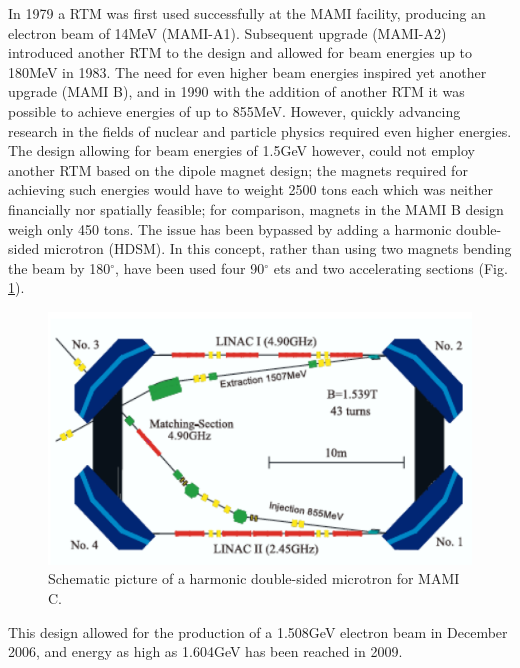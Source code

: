 In 1979 a RTM was first used successfully at the MAMI facility, producing an electron beam of 14MeV (MAMI-A1). Subsequent upgrade (MAMI-A2) introduced another RTM to the design and allowed for beam energies up to 180MeV in 1983. The need for even higher beam energies inspired yet another upgrade (MAMI B), and in 1990 with the addition of another RTM it was possible to achieve energies of up to 855MeV. However, quickly advancing research in the fields of nuclear and particle physics required even higher energies. The design allowing for beam energies of 1.5GeV however, could not employ another RTM based on the dipole magnet design; the magnets required for achieving such energies would have to weight 2500 tons each which was neither financially nor spatially feasible; for comparison, magnets in the MAMI B design weigh only 450 tons. The issue has been bypassed by adding a harmonic double-sided microtron (HDSM). In this concept, rather than using two magnets bending the beam by 180$^{\circ}$, have been used four 90$^{\circ}$ ets and two accelerating sections (Fig. \ref{mamic}). 

\begin{figure}[H]
\begin{center}
\includegraphics[scale=0.25]{pictures/png/HDSM.png}
\caption{Schematic picture of a harmonic double-sided microtron for MAMI C.}
\label{mamic}
\end{center}
\end{figure}

This design allowed for the production of a 1.508GeV electron beam in December 2006, and energy as high as 1.604GeV has been reached in 2009.

